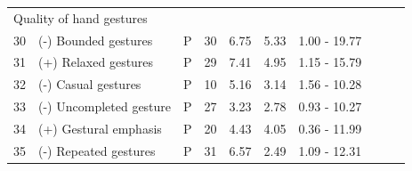 \begin{table}[]
{\begin{tabular}{llcclllccc}
\multicolumn{10}{l}{Quality of hand gestures} \\
30 & (-) Bounded gestures & P & 30 & 6.75 & 5.33 & 1.00 - 19.77 &  &  &  \\
31 & (+) Relaxed gestures & P & 29 & 7.41 & 4.95 & 1.15 - 15.79 &  &  &  \\
32 & (-) Casual gestures & P & 10 & 5.16 & 3.14 & 1.56 - 10.28 &  &  &  \\
33 & (-) Uncompleted gesture & P & 27 & 3.23 & 2.78 & 0.93 - 10.27 &  &  &  \\
34 & (+) Gestural emphasis & P & 20 & 4.43 & 4.05 & 0.36 - 11.99 &  &  &  \\
35 & (-) Repeated gestures & P & 31 & 6.57 & 2.49 & 1.09 - 12.31 &  &  &  \\ \hline
\end{tabular}%
}
\end{table}

